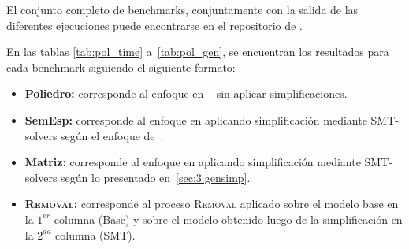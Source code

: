 El conjunto completo de benchmarks, conjuntamente con la salida de las diferentes ejecuciones puede 
encontrarse en el repositorio de \pachtool.

En las tablas \ref{tab:pol_time} a~\ref{tab:pol_gen}, se encuentran los resultados para cada benchmark siguiendo
el siguiente formato:

\begin{itemize}
    \item \textbf{Poliedro:} corresponde al enfoque en ~\cite{CarmonaC14} sin aplicar simplificaciones.
    \item \textbf{SemEsp:} corresponde al enfoque en \cite{CarmonaC14} aplicando simplificación mediante SMT-solvers según el enfoque de~\cite{LeonCB15}.
    \item \textbf{Matriz:} corresponde al enfoque en \cite{CarmonaC14} aplicando simplificación mediante SMT-solvers según lo 
      presentado en~\autoref{sec:3.gensimp}.
    \item \textbf{\textsc{Removal}:} corresponde al proceso \textsc{Removal} aplicado sobre el modelo base en la $1^{er}$ columna (Base) 
      y sobre el modelo obtenido luego de la simplificación en la $2^{da}$ columna (SMT).
\end{itemize}



